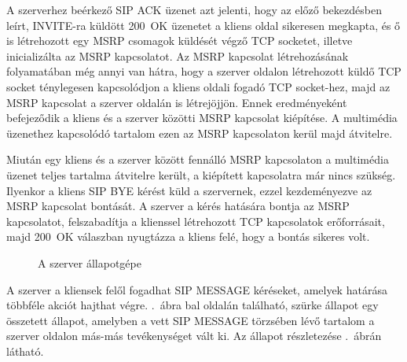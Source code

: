 A szerverhez beérkező SIP ACK üzenet azt jelenti, hogy az előző bekezdésben leírt, INVITE-ra küldött 200~OK üzenetet a kliens oldal sikeresen megkapta, és ő is létrehozott egy MSRP csomagok küldését végző TCP socketet, illetve inicializálta az MSRP kapcsolatot. Az MSRP kapcsolat létrehozásának folyamatában még annyi van hátra, hogy a szerver oldalon létrehozott küldő TCP socket ténylegesen kapcsolódjon a kliens oldali fogadó TCP socket-hez, majd az MSRP kapcsolat a szerver oldalán is létrejöjjön. Ennek eredményeként befejeződik a kliens és a szerver közötti MSRP kapcsolat kiépítése. A multimédia üzenethez kapcsolódó tartalom ezen az MSRP kapcsolaton kerül majd átvitelre.

Miután egy kliens és a szerver között fennálló MSRP kapcsolaton a multimédia üzenet teljes tartalma átvitelre került, a kiépített kapcsolatra már nincs szükség. Ilyenkor a kliens SIP BYE kérést küld a szervernek, ezzel kezdeményezve az MSRP kapcsolat bontását. A szerver a kérés hatására bontja az MSRP  kapcsolatot, felszabadítja a klienssel létrehozott TCP kapcsolatok erőforrásait, majd 200~OK válaszban nyugtázza a kliens felé, hogy a bontás sikeres volt.

\begin{figure}[htbp]
\center
{}
\caption{A szerver állapotgépe}
\label{fig:server_statemachine_full}
\end{figure}

A szerver a kliensek felől fogadhat SIP MESSAGE kéréseket, amelyek határása többféle akciót hajthat végre. .~ábra bal oldalán található, szürke állapot egy összetett állapot, amelyben a vett SIP MESSAGE törzsében lévő tartalom a szerver oldalon más-más tevékenységet vált ki. Az állapot részletezése .~ábrán látható.

